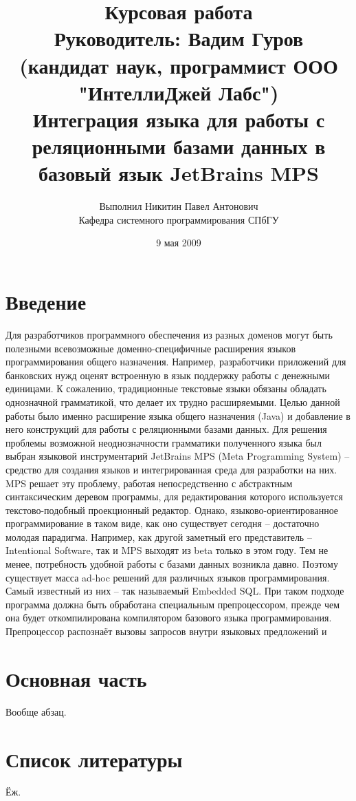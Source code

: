 \documentclass[12pt]{article}
\title{Курсовая работа\\
Руководитель: Вадим Гуров\\
(кандидат наук, программист ООО "ИнтеллиДжей Лабс")\\
Интеграция языка для работы с реляционными базами данных в базовый язык JetBrains MPS}
\author{Выполнил Никитин Павел Антонович\\
Кафедра системного программирования СПбГУ}
\date{9 мая 2009}
\begin{document}
\maketitle	

\section{Введение}

Для разработчиков программного обеспечения из разных доменов могут быть полезными всевозможные доменно-специфичные расширения языков программирования общего назначения. Например, разработчики приложений для банковских нужд оценят встроенную в язык поддержку работы с денежными единицами. К сожалению, традиционные текстовые языки обязаны обладать однозначной грамматикой, что делает их трудно расширяемыми. Целью данной работы было именно расширение языка общего назначения (Java) и добавление в него конструкций для работы с реляционными базами данных. Для решения проблемы возможной неоднозначности грамматики полученного языка был выбран языковой инструментарий JetBrains MPS (Meta Programming System) -- средство для создания языков и интегрированная среда для разработки на них. MPS решает эту проблему, работая непосредственно с абстрактным синтаксическим деревом программы, для редактирования которого используется текстово-подобный проекционный редактор. Однако, языково-ориентированное программирование в таком виде, как оно существует сегодня -- достаточно молодая парадигма. Например, как другой заметный его представитель -- Intentional Software, так и MPS выходят из beta только в этом году. Тем не менее, потребность удобной работы с базами данных возникла давно. Поэтому существует масса ad-hoc решений для различных языков программирования. Самый известный из них -- так называемый Embedded SQL. При таком подходе программа должна быть обработана специальным препроцессором, прежде чем она будет откомпилирована компилятором базового языка программирования. Препроцессор распознаёт вызовы запросов внутри языковых предложений и 

\section{Основная часть}
Вообще абзац.

\section{Список литературы}
Ёж.
\end{document}
